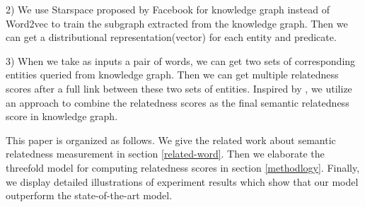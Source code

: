 2) We use Starspace proposed by Facebook for knowledge graph instead of Word2vec to train the subgraph
extracted from the knowledge graph. Then we can get a distributional representation(vector) for each
entity and predicate. 

3) When we take as inputs a pair of words, we can get two sets of corresponding entities queried from
knowledge graph. Then we can get multiple relatedness scores after a full link between these two sets of entities.
Inspired by \cite{acl/IacobacciPN15}, we utilize an approach to combine the 
relatedness scores as the final semantic relatedness score in knowledge graph.

This paper is organized as follows. We give the related work about semantic relatedness
measurement in section \ref{related-word}. Then we elaborate the threefold model for
computing relatedness scores in section \ref{methodlogy}. Finally, we display detailed
illustrations of experiment results which show that our model outperform the state-of-the-art model.






